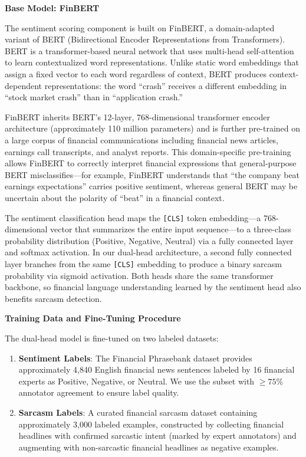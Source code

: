 \textbf{Base Model: FinBERT}

The sentiment scoring component is built on FinBERT, a domain-adapted variant of BERT (Bidirectional Encoder Representations from Transformers). BERT is a transformer-based neural network that uses multi-head self-attention to learn contextualized word representations. Unlike static word embeddings that assign a fixed vector to each word regardless of context, BERT produces context-dependent representations: the word ``crash'' receives a different embedding in ``stock market crash'' than in ``application crash.''

FinBERT inherits BERT's 12-layer, 768-dimensional transformer encoder architecture (approximately 110 million parameters) and is further pre-trained on a large corpus of financial communications including financial news articles, earnings call transcripts, and analyst reports. This domain-specific pre-training allows FinBERT to correctly interpret financial expressions that general-purpose BERT misclassifies---for example, FinBERT understands that ``the company beat earnings expectations'' carries positive sentiment, whereas general BERT may be uncertain about the polarity of ``beat'' in a financial context.

The sentiment classification head maps the \texttt{[CLS]} token embedding---a 768-dimensional vector that summarizes the entire input sequence---to a three-class probability distribution (Positive, Negative, Neutral) via a fully connected layer and softmax activation. In our dual-head architecture, a second fully connected layer branches from the same \texttt{[CLS]} embedding to produce a binary sarcasm probability via sigmoid activation. Both heads share the same transformer backbone, so financial language understanding learned by the sentiment head also benefits sarcasm detection.

\textbf{Training Data and Fine-Tuning Procedure}

The dual-head model is fine-tuned on two labeled datasets:
\begin{enumerate}
    \item \textbf{Sentiment Labels}: The Financial Phrasebank dataset provides approximately 4,840 English financial news sentences labeled by 16 financial experts as Positive, Negative, or Neutral. We use the subset with $\geq 75\%$ annotator agreement to ensure label quality.
    \item \textbf{Sarcasm Labels}: A curated financial sarcasm dataset containing approximately 3,000 labeled examples, constructed by collecting financial headlines with confirmed sarcastic intent (marked by expert annotators) and augmenting with non-sarcastic financial headlines as negative examples.
\end{enumerate}

